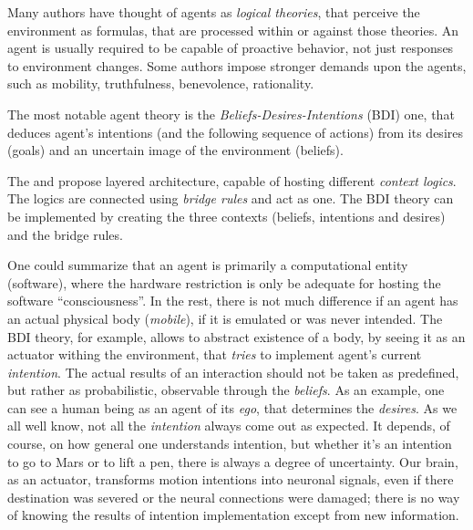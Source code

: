 Many authors have thought of agents as \emph{logical theories}, that perceive
the environment as formulas, that are processed within or against those theories.
An agent is usually required to be capable of proactive behavior, not
just responses to environment changes. Some authors impose stronger demands upon
the agents, such as mobility, truthfulness, benevolence, rationality.

The most notable agent theory is the \emph{Beliefs-Desires-Intentions} (BDI) one,
that deduces agent's intentions (and the following sequence of actions)
from its desires (goals) and an uncertain image of the environment (beliefs).


The \cite{UAB-Thesis} and \cite{PNoriega} propose layered architecture,
capable of hosting different \emph{context logics}.
The logics are connected using \emph{bridge rules} and act as one.
The BDI theory can be implemented by creating the three contexts
(beliefs, intentions and desires) and the bridge rules.

\todo{}


\bigskip
\medskip

\noindent
One could summarize that an agent is primarily a computational entity (software),
where the hardware restriction is only be adequate for hosting the software
``consciousness''. In the rest, there is not much difference if an agent has
an actual physical body (\emph{mobile}), if it is emulated or was never intended.
The BDI theory, for example, allows to abstract existence of a body,
by seeing it as an actuator withing the environment, that \emph{tries} to
implement agent's current \emph{intention}.
The actual results of an interaction should not be taken as predefined, but rather
as probabilistic, observable through the \emph{beliefs}. As an example, one can
see a human being as an agent of its \emph{ego}, that determines the \emph{desires}.
As we all well know, not all the \emph{intention} always come out as expected.
It depends, of course, on how general one understands intention, but whether
it's an intention to go to Mars or to lift a pen, there is always a degree of
uncertainty. Our brain, as an actuator, transforms motion intentions into
neuronal signals, even if there destination was severed or the neural connections
were damaged; there is no way of knowing the results of intention implementation
except from new information.

